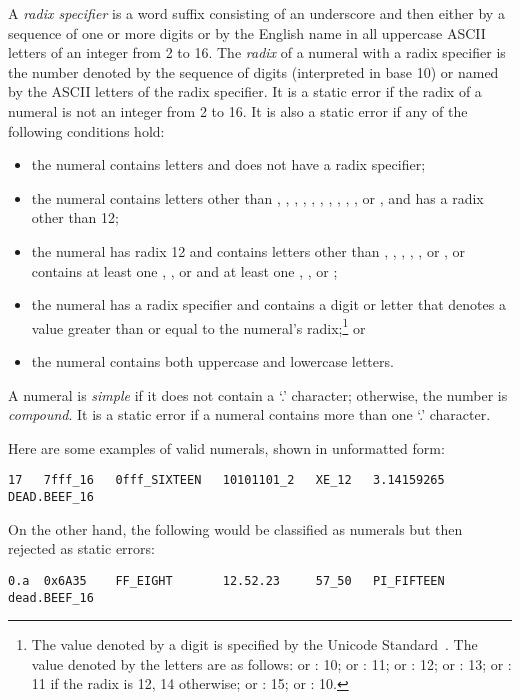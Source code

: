 A \emph{radix specifier}
is a word suffix consisting of
an underscore and then
either by a sequence of one or more digits
or by the English name in all uppercase ASCII letters
of an integer from 2 to 16.
The \emph{radix} of a numeral with a radix specifier
is the number
denoted by the sequence of digits
(interpreted in base 10)
or named by the ASCII letters of the radix specifier.
It is a static error
if the radix of a numeral is not an integer from 2 to 16.
It is also a static error if any of the following conditions hold:
\begin{itemize}

\item
the numeral contains letters and does not have a radix specifier;

\item
the numeral contains letters other than
, , , , , ,
, , , ,  or ,
and has a radix other than 12;

\item
the numeral has radix 12 and contains letters other than
, , , 
, ,  or ,
or contains at least one , ,  or 
and at least one , ,  or ;

\item
the numeral has a radix specifier
and contains a digit or letter that denotes a value
greater than or equal to the numeral's radix;\footnote{The
value denoted by a digit is specified
by the Unicode Standard~\cite{Unicode}.
The value denoted by the letters are as follows:
 or : 10;
 or : 11;
 or : 12;
 or : 13;
 or : 11 if the radix is 12, 14 otherwise;
 or : 15;
 or : 10.
}
or

\item
the numeral contains both uppercase and lowercase letters.

\end{itemize}

A numeral is \emph{simple} if it does not contain a `.' character;
otherwise, the number is \emph{compound}.
It is a static error if a numeral contains
more than one `.' character.


Here are some examples of valid numerals, shown in unformatted form:
\begin{verbatim}
17   7fff_16   0fff_SIXTEEN   10101101_2   XE_12   3.14159265   DEAD.BEEF_16
\end{verbatim}
On the other hand, the following would be classified as numerals
but then rejected as static errors:
\begin{verbatim}
0.a  0x6A35    FF_EIGHT       12.52.23     57_50   PI_FIFTEEN   dead.BEEF_16
\end{verbatim}

